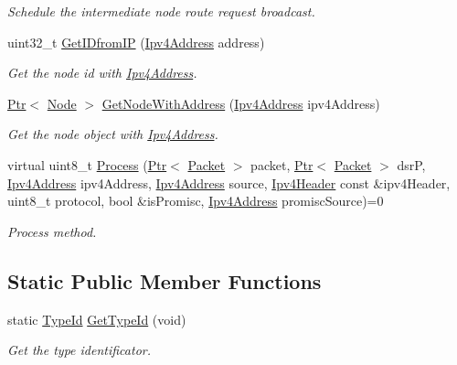 \begin{DoxyCompactItemize}
\begin{DoxyCompactList}\small\item\em Schedule the intermediate node route request broadcast. \end{DoxyCompactList}\item 
uint32\+\_\+t \hyperlink{classns3_1_1dsr_1_1DsrOptions_a7e53a9a0421c607e17866e7dd0dd5440}{Get\+I\+Dfrom\+IP} (\hyperlink{classns3_1_1Ipv4Address}{Ipv4\+Address} address)
\begin{DoxyCompactList}\small\item\em Get the node id with \hyperlink{classns3_1_1Ipv4Address}{Ipv4\+Address}. \end{DoxyCompactList}\item 
\hyperlink{classns3_1_1Ptr}{Ptr}$<$ \hyperlink{classns3_1_1Node}{Node} $>$ \hyperlink{classns3_1_1dsr_1_1DsrOptions_a1a91f820f3d754a477a54bad547ca659}{Get\+Node\+With\+Address} (\hyperlink{classns3_1_1Ipv4Address}{Ipv4\+Address} ipv4\+Address)
\begin{DoxyCompactList}\small\item\em Get the node object with \hyperlink{classns3_1_1Ipv4Address}{Ipv4\+Address}. \end{DoxyCompactList}\item 
virtual uint8\+\_\+t \hyperlink{classns3_1_1dsr_1_1DsrOptions_ac34fb87a95464f3ea9d82ad12253a5cc}{Process} (\hyperlink{classns3_1_1Ptr}{Ptr}$<$ \hyperlink{classns3_1_1Packet}{Packet} $>$ packet, \hyperlink{classns3_1_1Ptr}{Ptr}$<$ \hyperlink{classns3_1_1Packet}{Packet} $>$ dsrP, \hyperlink{classns3_1_1Ipv4Address}{Ipv4\+Address} ipv4\+Address, \hyperlink{classns3_1_1Ipv4Address}{Ipv4\+Address} source, \hyperlink{classns3_1_1Ipv4Header}{Ipv4\+Header} const \&ipv4\+Header, uint8\+\_\+t protocol, bool \&is\+Promisc, \hyperlink{classns3_1_1Ipv4Address}{Ipv4\+Address} promisc\+Source)=0
\begin{DoxyCompactList}\small\item\em Process method. \end{DoxyCompactList}\end{DoxyCompactItemize}
\subsection*{Static Public Member Functions}
\begin{DoxyCompactItemize}
\item 
static \hyperlink{classns3_1_1TypeId}{Type\+Id} \hyperlink{classns3_1_1dsr_1_1DsrOptions_a30eca80bb80530a2c64064930b399b7c}{Get\+Type\+Id} (void)
\begin{DoxyCompactList}\small\item\em Get the type identificator. \end{DoxyCompactList}\end{DoxyCompactItemize}
